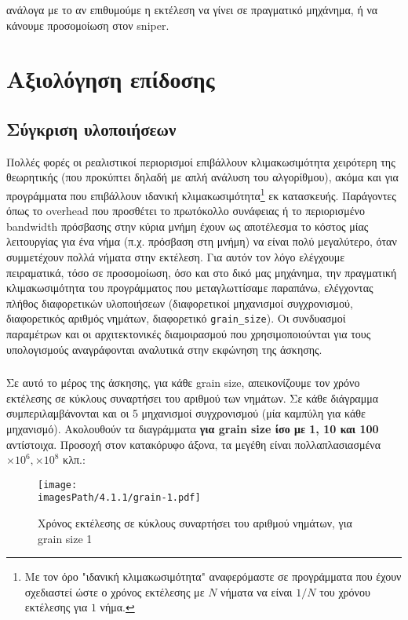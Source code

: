 \documentclass[12pt,a4paper]{article}
\newcommand{\imagesPath}{/home/nick/arch-ntua/ex03/graphs}
\newcommand{\myWidth}{0.8\linewidth}
\begin{document}
			ανάλογα με το αν επιθυμούμε η εκτέλεση να γίνει σε πραγματικό μηχάνημα, ή να κάνουμε προσομοίωση στον sniper.
	
	\section{Αξιολόγηση επίδοσης}
		
		\subsection{Σύγκριση υλοποιήσεων}
		
			Πολλές φορές οι ρεαλιστικοί περιορισμοί επιβάλλουν κλιμακωσιμότητα χειρότερη της θεωρητικής (που προκύπτει δηλαδή με απλή ανάλυση του αλγορίθμου), ακόμα και για προγράμματα που επιβάλλουν ιδανική κλιμακωσιμότητα\footnote{Με τον όρο "ιδανική κλιμακωσιμότητα" αναφερόμαστε σε προγράμματα που έχουν σχεδιαστεί ώστε ο χρόνος εκτέλεσης με $N$ νήματα να είναι $1/N$ του χρόνου εκτέλεσης για $1$ νήμα.} εκ κατασκευής. Παράγοντες όπως το overhead που προσθέτει το πρωτόκολλο συνάφειας ή το περιορισμένο bandwidth πρόσβασης στην κύρια μνήμη έχουν ως αποτέλεσμα το κόστος μίας λειτουργίας για ένα νήμα (π.χ. πρόσβαση στη μνήμη) να είναι πολύ μεγαλύτερο, όταν συμμετέχουν πολλά νήματα στην εκτέλεση. Για αυτόν τον λόγο ελέγχουμε πειραματικά, τόσο σε προσομοίωση, όσο και στο δικό μας μηχάνημα, την πραγματική κλιμακωσιμότητα του προγράμματος που μεταγλωττίσαμε παραπάνω, ελέγχοντας πλήθος διαφορετικών υλοποιήσεων (διαφορετικοί μηχανισμοί συγχρονισμού, διαφορετικός αριθμός νημάτων, διαφορετικό \verb|grain_size|). Οι συνδυασμοί παραμέτρων και οι αρχιτεκτονικές διαμοιρασμού που χρησιμοποιούνται για τους υπολογισμούς αναγράφονται αναλυτικά στην εκφώνηση της άσκησης.
			
			\subsubsection{}
			Σε αυτό το μέρος της άσκησης, για κάθε grain size, απεικονίζουμε τον χρόνο εκτέλεσης σε κύκλους συναρτήσει του αριθμού των νημάτων. Σε κάθε διάγραμμα συμπεριλαμβάνονται και οι 5 μηχανισμοί συγχρονισμού (μία καμπύλη για κάθε μηχανισμό). Ακολουθούν τα διαγράμματα \textbf{για grain size ίσο με 1, 10 και 100} αντίστοιχα. Προσοχή στον κατακόρυφο άξονα, τα μεγέθη είναι πολλαπλασιασμένα $\times 10^6, \times 10^8$ κλπ.: 
			
				\begin{figure}[H]
					\begin{center}
						\texttt{[image: \\imagesPath/4.1.1/grain-1.pdf]}
						\caption{Χρόνος εκτέλεσης σε κύκλους συναρτήσει του αριθμού νημάτων, για grain size 1}
					\end{center}
				\end{figure}
			
\end{document}

